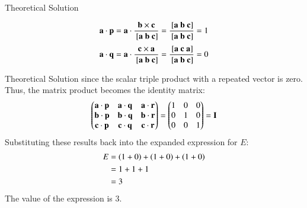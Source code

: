 \documentclass{beamer}
\begin{document}
\begin{frame}{Theoretical Solution}

\begin{align}
    \vec{a} \cdot \vec{p} = \vec{a} \cdot \frac{\vec{b} \times \vec{c}}{\sbrak{\vec{a}\ \vec{b}\ \vec{c}}} = \frac{\sbrak{\vec{a}\ \vec{b}\ \vec{c}}}{\sbrak{\vec{a}\ \vec{b}\ \vec{c}}} = 1
\end{align}
\begin{align}
    \vec{a} \cdot \vec{q} = \vec{a} \cdot \frac{\vec{c} \times \vec{a}}{\sbrak{\vec{a}\ \vec{b}\ \vec{c}}} = \frac{\sbrak{\vec{a}\ \vec{c}\ \vec{a}}}{\sbrak{\vec{a}\ \vec{b}\ \vec{c}}} = 0
\end{align}
\end{frame}
\begin{frame}{Theoretical Solution}
since the scalar triple product with a repeated vector is zero.
Thus, the matrix product becomes the identity matrix:
\begin{align}
    \begin{pmatrix}\mathbf{a} \cdot \mathbf{p} & \mathbf{a} \cdot \mathbf{q} & \mathbf{a} \cdot \mathbf{r} \\
        \mathbf{b} \cdot \mathbf{p} & \mathbf{b} \cdot \mathbf{q} & \mathbf{b} \cdot \mathbf{r} \\
        \mathbf{c} \cdot \mathbf{p} & \mathbf{c} \cdot \mathbf{q} & \mathbf{c} \cdot \mathbf{r}\end{pmatrix}
    =\begin{pmatrix}1 & 0 & 0 \\
        0 & 1 & 0 \\
        0 & 0 & 1\end{pmatrix} = \mathbf{I}
\end{align}
Substituting these results back into the expanded expression for $E$:
\begin{align}
    E &= \left(1 + 0\right) + \left(1 + 0\right) + \left(1 + 0\right) \\
      &= 1 + 1 + 1 \\
      &= 3
\end{align}
The value of the expression is 3.

\end{frame}
\end{document}
